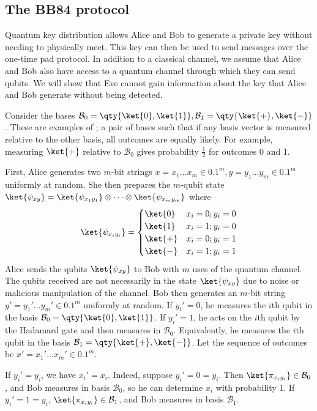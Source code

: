 \subsection{The BB84 protocol}
Quantum key distribution allows Alice and Bob to generate a private key without needing to physically meet.
This key can then be used to send messages over the one-time pad protocol.
In addition to a classical channel, we assume that Alice and Bob also have access to a quantum channel through which they can send qubits.
We will show that Eve cannot gain information about the key that Alice and Bob generate without being detected.

Consider the bases $\mathcal B_0 = \qty{\ket{0}, \ket{1}}, \mathcal B_1 = \qty{\ket{+}, \ket{-}}$.
These are examples of ; a pair of bases such that if any basis vector is measured relative to the other basis, all outcomes are equally likely.
For example, measuring $\ket{+}$ relative to $\mathcal B_0$ gives probability $\frac{1}{2}$ for outcomes 0 and 1.

First, Alice generates two $m$-bit strings $x = x_1 \dots x_m \in \qty{0,1}^m, y = y_1 \dots y_m \in \qty{0,1}^m$ uniformly at random.
She then prepares the $m$-qubit state $\ket{\psi_{xy}} = \ket{\psi_{x_1 y_1}} \otimes \dots \otimes \ket{\psi_{x_m y_m}}$ where
\[ \ket{\psi_{x_i y_i}} = \begin{cases}
    \ket{0} & x_i = 0; y_i = 0 \\
    \ket{1} & x_i = 1; y_i = 0 \\
    \ket{+} & x_i = 0; y_i = 1 \\
    \ket{-} & x_i = 1; y_i = 1
\end{cases} \]
Alice sends the qubits $\ket{\psi_{xy}}$ to Bob with $m$ uses of the quantum channel.
The qubits received are not necessarily in the state $\ket{\psi_{xy}}$ due to noise or malicious manipulation of the channel.
Bob then generates an $m$-bit string $y' = y_1' \dots y_m' \in \qty{0,1}^m$ uniformly at random.
If $y_i' = 0$, he measures the $i$th qubit in the basis $\mathcal B_0 = \qty{\ket{0}, \ket{1}}$.
If $y_i' = 1$, he acts on the $i$th qubit by the Hadamard gate and then measures in $\mathcal B_0$.
Equivalently, he measures the $i$th qubit in the basis $\mathcal B_1 = \qty{\ket{+}, \ket{-}}$.
Let the sequence of outcomes be $x' = x_1' \dots x_m' \in \qty{0,1}^m$.

If $y_i' = y_i$, we have $x_i' = x_i$.
Indeed, suppose $y_i' = 0 = y_i$.
Then $\ket{\pi_{x_i y_i}} \in \mathcal B_0$, and Bob measures in basis $\mathcal B_0$, so he can determine $x_i$ with probability 1.
If $y_i' = 1 = y_i$, $\ket{\pi_{x_i y_i}} \in \mathcal B_1$, and Bob measures in basis $\mathcal B_1$.


